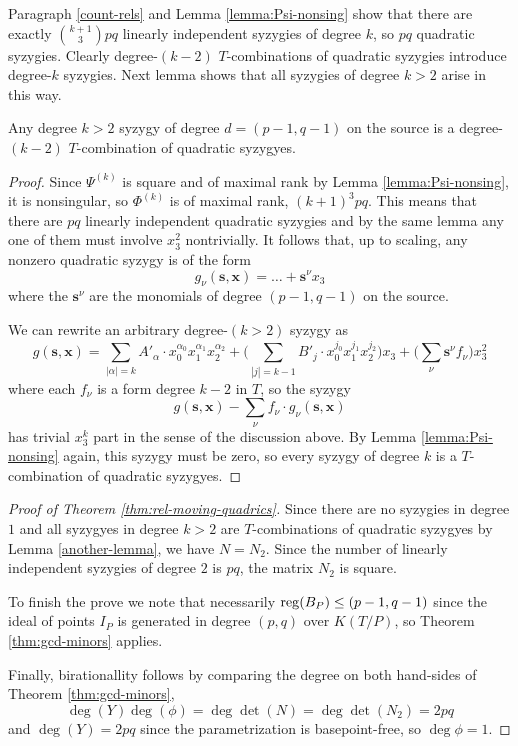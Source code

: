 \documentclass[fleqn,reqno]{amsart}
\numberwithin{first}{chapter}
\numberwithin{section}{chapter}
\numberwithin{equation}{first}
\begin{document}
\begin{paragraph}
	Paragraph \ref{count-rels} and Lemma \ref{lemma:Psi-nonsing} show that there are exactly
	$\binom{k+1}{3}pq$ linearly independent syzygies of degree $k$, so $pq$ quadratic syzygies.
	Clearly degree-$(k-2)$ $T$-combinations of quadratic syzygies introduce degree-$k$ syzygies.
	Next lemma shows that all syzygies of degree $k>2$ arise in this way.
\end{paragraph}

\begin{lemma}
	\label{another-lemma}
	Any degree $k>2$ syzygy of degree $d=(p-1,q-1)$ on the source is a degree-$(k-2)$
	$T$-combination of quadratic syzygyes.
\end{lemma}

\begin{proof}
	Since $\Psi^{(k)}$ is square and of maximal rank by Lemma \ref{lemma:Psi-nonsing},
	it is nonsingular, so $\Phi^{(k)}$ is of maximal rank, $(k+1)^3pq$.
	This means that there are $pq$ linearly independent quadratic syzygies
	and by the same lemma any one of them must involve $x_3^2$ nontrivially.
	It follows that, up to scaling, any nonzero quadratic syzygy is of the form
	\[
		g_\nu(\mathbf s,\mathbf x)=\ldots+{\mathbf{s}}^\nu x_3
	\]
	where the $\mathbf{s}^\nu$ are the monomials of degree $(p-1,q-1)$ on the source.
	
	We can rewrite an arbitrary degree-$(k>2)$ syzygy as
	\[
		g(\mathbf s, \mathbf x)=\sum_{|\alpha|=k} A'_\alpha\cdot
		x_0^{\alpha_0}x_1^{\alpha_1}x_2^{\alpha_2}+
		\big(\sum_{|j|=k-1} B'_{j}\cdot
		x_0^{j_0}x_1^{j_1}x_2^{j_2}\big)x_3+
		\big(\sum_\nu \mathbf{s}^\nu f_\nu\big)x_3^2
	\]
	where each $f_\nu$ is a form degree $k-2$ in $T$, so the syzygy
	\[
		g(\mathbf s, \mathbf x)-\sum_\nu f_\nu\cdot g_\nu(\mathbf s, \mathbf x)
	\]
	has trivial $x_3^k$ part in the sense of the discussion above.
	By Lemma \ref{lemma:Psi-nonsing} again, this syzygy must be zero,
	so every syzygy of degree $k$ is a $T$-combination of quadratic syzygyes.
\end{proof}

\begin{proof}[\titlestyle Proof of Theorem \ref{thm:rel-moving-quadrics}]
	Since there are no syzygies in degree $1$ and all syzygyes in degree $k>2$ are $T$-combinations
	of quadratic syzygyes by Lemma \ref{another-lemma},
	we have $N=N_2$. Since the number of linearly independent syzygies
	of degree $2$ is $pq$, the matrix $N_2$ is square.
	
	To finish the prove we note that necessarily $\operatorname{reg}(B_P)\leq(p-1,q-1)$ since the ideal of points
	$I_P$ is generated in degree $(p,q)$ over $K(T/P)$,
	so Theorem \ref{thm:gcd-minors} applies.
	
	Finally, birationallity follows by comparing the degree on both hand-sides of Theorem \ref{thm:gcd-minors},
	\[
		\deg(Y)\deg(\phi)=\deg\det (N)=\deg\det(N_2)=2pq
	\]
	and $\deg(Y)=2pq$ since the parametrization is basepoint-free, so $\deg\phi=1$.
\end{proof}
\end{document}
